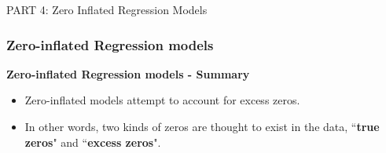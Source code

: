 \documentclass[MASTER.tex]{subfiles}
\begin{document}
	
\begin{frame}
	
	{\LARGE
		PART 4:	Zero Inflated Regression Models
	} \bigskip
	\Large
	
	
\end{frame}
\begin{frame}[fragile]
	\frametitle{Zero-inflated Regression models}
	\Large
	\vspace{-0.5cm}
	\textbf{Zero-inflated Regression models - Summary}
	\begin{itemize}
		\item Zero-inflated models attempt to account for excess zeros. 
		\item In other words, two kinds of zeros are thought to exist in the data, ``\textbf{true zeros}" and ``\textbf{excess zeros}". 
	\end{itemize}
\end{frame}
\end{document}
